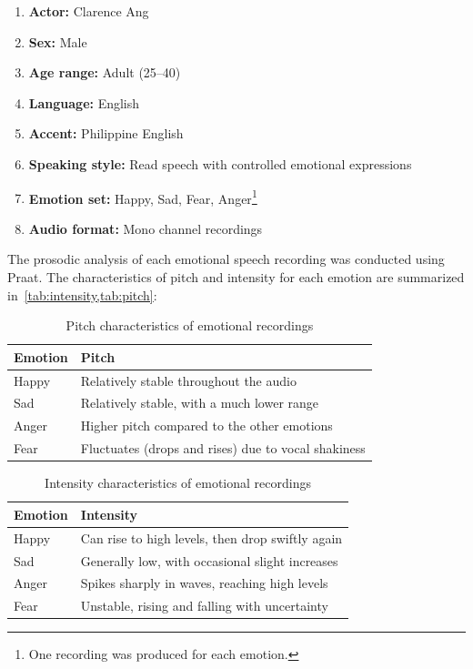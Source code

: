 \documentclass{article}
\begin{document}
\begin{enumerate}
    \item \textbf{Actor:} Clarence Ang
    \item \textbf{Sex:} Male
    \item \textbf{Age range:} Adult (25--40)
    \item \textbf{Language:} English
    \item \textbf{Accent:} Philippine English
    \item \textbf{Speaking style:} Read speech with controlled emotional expressions
    \item \textbf{Emotion set:} Happy, Sad, Fear, Anger\footnote{One recording was produced for each emotion.}
    \item \textbf{Audio format:} Mono channel recordings
\end{enumerate}

The prosodic analysis of each emotional speech recording was conducted using
Praat. The characteristics of pitch and intensity for each emotion are
summarized in~\cref{tab:intensity,tab:pitch}:

\begin{table}[h]
    \centering
    \caption{Pitch characteristics of emotional recordings}
    \begin{tabular}{ll}
        \hline
        \textbf{Emotion} & \textbf{Pitch}                                      \\
        \hline
        Happy            & Relatively stable throughout the audio              \\
        Sad              & Relatively stable, with a much lower range          \\
        Anger            & Higher pitch compared to the other emotions         \\
        Fear             & Fluctuates (drops and rises) due to vocal shakiness \\
        \hline
    \end{tabular}\label{tab:pitch}
\end{table}

\begin{table}[h]
    \centering
    \caption{Intensity characteristics of emotional recordings}
    \begin{tabular}{ll}
        \hline
        \textbf{Emotion} & \textbf{Intensity}                               \\
        \hline
        Happy            & Can rise to high levels, then drop swiftly again \\
        Sad              & Generally low, with occasional slight increases  \\
        Anger            & Spikes sharply in waves, reaching high levels    \\
        Fear             & Unstable, rising and falling with uncertainty    \\
        \hline
    \end{tabular}\label{tab:intensity}
\end{table}
\end{document}
